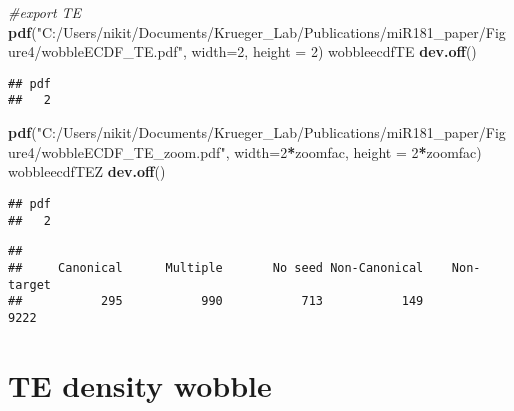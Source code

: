 \documentclass[
]{article}
\newenvironment{Shaded}{\begin{snugshade}}{\end{snugshade}}
\newcommand{\AttributeTok}[1]{\textcolor[rgb]{0.13,0.29,0.53}{#1}}
\newcommand{\CommentTok}[1]{\textcolor[rgb]{0.56,0.35,0.01}{\textit{#1}}}
\newcommand{\DecValTok}[1]{\textcolor[rgb]{0.00,0.00,0.81}{#1}}
\newcommand{\FunctionTok}[1]{\textcolor[rgb]{0.13,0.29,0.53}{\textbf{#1}}}
\newcommand{\NormalTok}[1]{#1}
\newcommand{\SpecialCharTok}[1]{\textcolor[rgb]{0.81,0.36,0.00}{\textbf{#1}}}
\newcommand{\StringTok}[1]{\textcolor[rgb]{0.31,0.60,0.02}{#1}}
\begin{document}
\begin{Shaded}
\begin{Highlighting}[]
\CommentTok{\#export TE}
\FunctionTok{pdf}\NormalTok{(}\StringTok{"C:/Users/nikit/Documents/Krueger\_Lab/Publications/miR181\_paper/Figure4/wobbleECDF\_TE.pdf"}\NormalTok{, }\AttributeTok{width=}\DecValTok{2}\NormalTok{, }\AttributeTok{height =} \DecValTok{2}\NormalTok{)}
\NormalTok{wobbleecdfTE}
\FunctionTok{dev.off}\NormalTok{()}
\end{Highlighting}
\end{Shaded}

\begin{verbatim}
## pdf 
##   2
\end{verbatim}

\begin{Shaded}
\begin{Highlighting}[]
\FunctionTok{pdf}\NormalTok{(}\StringTok{"C:/Users/nikit/Documents/Krueger\_Lab/Publications/miR181\_paper/Figure4/wobbleECDF\_TE\_zoom.pdf"}\NormalTok{, }\AttributeTok{width=}\DecValTok{2}\SpecialCharTok{*}\NormalTok{zoomfac, }\AttributeTok{height =} \DecValTok{2}\SpecialCharTok{*}\NormalTok{zoomfac)}
\NormalTok{wobbleecdfTEZ}
\FunctionTok{dev.off}\NormalTok{()}
\end{Highlighting}
\end{Shaded}

\begin{verbatim}
## pdf 
##   2
\end{verbatim}

\begin{Shaded}
\end{Shaded}

\begin{verbatim}
## 
##     Canonical      Multiple       No seed Non-Canonical    Non-target 
##           295           990           713           149          9222
\end{verbatim}

\hypertarget{te-density-wobble}{%
\section{TE density wobble}\label{te-density-wobble}}
\end{document}
